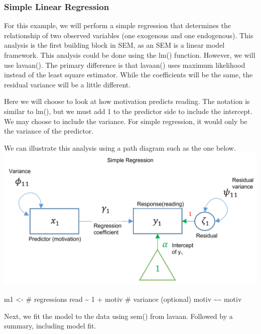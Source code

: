 \documentclass[
]{article}
\newenvironment{Shaded}{\begin{snugshade}}{\end{snugshade}}
\newcommand{\NormalTok}[1]{#1}
\newcommand{\OtherTok}[1]{\textcolor[rgb]{0.56,0.35,0.01}{#1}}
\newcommand{\StringTok}[1]{\textcolor[rgb]{0.31,0.60,0.02}{#1}}
\begin{document}
\hypertarget{simple-linear-regression}{%
\subsubsection{Simple Linear
Regression}\label{simple-linear-regression}}

For this example, we will perform a simple regression that determines
the relationship of two observed variables (one exogenous and one
endogenous). This analysis is the first building block in SEM, as an SEM
is a linear model framework. This analysis could be done using the lm()
function. However, we will use lavaan(). The primary difference is that
lavaan() uses maximum likelihood instead of the least square estimator.
While the coefficients will be the same, the residual variance will be a
little different.

Here we will choose to look at how motivation predicts reading. The
notation is similar to lm(), but we must add 1 to the predictor side to
include the intercept. We may choose to include the variance. For simple
regression, it would only be the variance of the predictor.

We can illustrate this analysis using a path diagram such as the one
below. \includegraphics{SimRegLabl.PNG}

\begin{Shaded}
\begin{Highlighting}[]
\NormalTok{m1 }\OtherTok{\textless{}{-}}   \StringTok{\textquotesingle{}}
\StringTok{  \# regressions}
\StringTok{    read \textasciitilde{} 1 + motiv}
\StringTok{  \# variance (optional)}
\StringTok{    motiv \textasciitilde{}\textasciitilde{} motiv}
\StringTok{\textquotesingle{}}
\end{Highlighting}
\end{Shaded}

Next, we fit the model to the data using sem() from lavaan. Followed by
a summary, including model fit.
\end{document}
